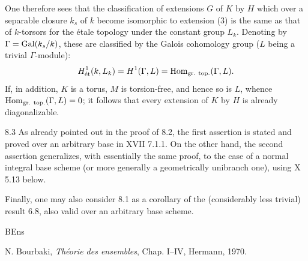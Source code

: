 One therefore sees that the classification of extensions $G$ of $K$ by $H$ which over a separable closure $k_s$ of $k$ become isomorphic to extension (3) is the same as that of $k$-torsors for the étale topology under the constant group $L_k$. Denoting by $\Gamma=\operatorname{Gal}(k_s/k)$, these are classified by the Galois cohomology group ($L$ being a trivial $\Gamma$-module):
\[
H^1_{\mathrm{\acute et}}(k,L_k)=H^1(\Gamma,L)=\operatorname{Hom}_{\mathrm{gr.\ top.}}(\Gamma,L).
\]
If, in addition, $K$ is a torus, $M$ is torsion-free, and hence so is $L$, whence $\Hom_{\mathrm{gr.\ top.}}(\Gamma,L)=0$; it follows that every extension of $K$ by $H$ is already diagonalizable.
\begin{remark}{8.3}\label{IX.8.3}
As already pointed out in the proof of 8.2, the first assertion is stated and proved over an arbitrary base in XVII 7.1.1. On the other hand, the second assertion generalizes, with essentially the same proof, to the case of a normal integral base scheme (or more generally a geometrically unibranch one), using X 5.13 below.

Finally, one may also consider 8.1 as a corollary of the (considerably less trivial) result 6.8, also valid over an arbitrary base scheme.
\end{remark}
\begin{thebibliography}{BEns}
\item[]
 N. Bourbaki, \emph{Théorie des ensembles}, Chap. I--IV, Hermann, 1970.
\end{thebibliography}
